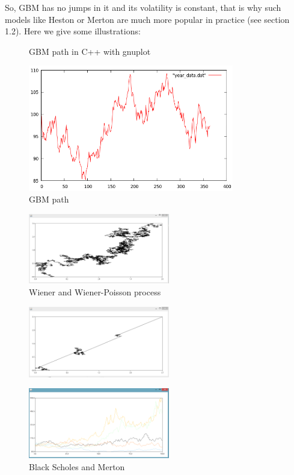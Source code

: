 \documentclass[a4paper]{report}
\begin{document}
\begin{itemize}
So, GBM has no jumps in it and its volatility is constant, that is why such models like Heston or Merton are much more popular in practice (see section 1.2). Here we give some illustrations: \\

\begin{figure}[H]
    \centering
    \caption{GBM path in C++ with gnuplot}
    \includegraphics[width=0.8\textwidth]{gbmgnu.png}
    \caption{GBM path}
\end{figure}   





\begin{figure}[H]
    \centering
    \caption{Wiener and Wiener-Poisson process}
    \includegraphics[width=0.55\textwidth]{brown.png}
\end{figure}

\begin{figure}[H]
    \centering
    \includegraphics[width=0.55\textwidth]{poisson.png}
\end{figure}

\begin{figure}[H]
    \centering
    \caption{Black Scholes and Merton}
    \includegraphics[width=0.55\textwidth]{wiener.png}
\end{figure}


\end{itemize}
\end{document}
